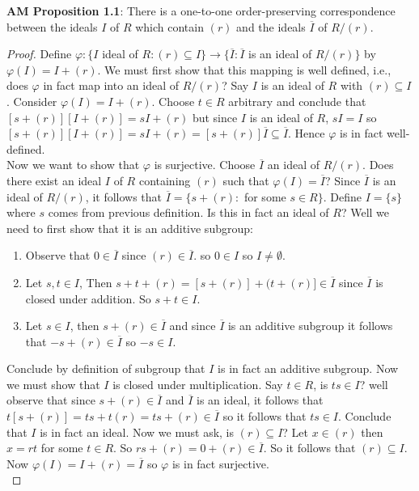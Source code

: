 \documentclass[8pt]{amsart}
\theoremstyle{plain}%
\theoremstyle{definition}
\theoremstyle{remark}
\numberwithin{equation}{section}
\begin{document}
\textbf{AM Proposition 1.1}: There is a one-to-one order-preserving correspondence between the ideals $I$ of $R$ which contain $(r)$ and the ideals $\overline I$ of $R/(r)$.
	\begin{proof}
		Define $\varphi : \{ I$ ideal of $R : (r) \subseteq I\} \to \{\overline I : \overline I$ is an ideal of $R/(r)\}$ by $\varphi(I) = I + (r)$. We must first show that this mapping is well defined, i.e., does $\varphi$ in fact map into an ideal of $R/(r)$? Say $I$ is an ideal of $R$ with $(r) \subseteq I$. Consider $\varphi(I) = I + (r)$. Choose $t \in R$ arbitrary and conclude that $[s + (r)][I + (r)] = sI + (r)$ but since $I$ is an ideal of $R$, $sI = I$ so $[s + (r)][I + (r)] = sI + (r) = [s + (r)] \overline I \subseteq \overline I$. Hence $\varphi$ is in fact well-defined.\\

		Now we want to show that $\varphi$ is surjective. Choose $\overline I$ an ideal of $R/(r)$. Does there exist an ideal $I$ of $R$ containing $(r)$ such that $\varphi(I) = \overline I$? Since $\overline I$ is an ideal of $R/(r)$, it follows that $\overline I = \{s + (r) : $ for some $s \in R\}$. Define $I = \{s\}$ where $s$ comes from previous definition. Is this in fact an ideal of $R$? Well we need to first show that it is an additive subgroup:
		\begin{enumerate}
			\item Observe that $0 \in \overline I$ since $(r) \in \overline I$. so $0 \in I$ so $I \neq \emptyset$.
			\item Let $s, t \in I$, Then $s + t + (r) = [s + (r)] + (t + (r)] \in \overline I$ since $\overline I$ is closed under addition. So $s + t \in I$.
			\item Let $s \in I$, then $s + (r) \in \overline I$ and since $\overline I$ is an additive subgroup it follows that $-s + (r) \in \overline I$ so $-s \in I$.
		\end{enumerate}
		Conclude by definition of subgroup that $I$ is in fact an additive subgroup. Now we must show that $I$ is closed under multiplication. Say $t \in R$, is $ts \in I$? well observe that since $s + (r) \in \overline I$ and $\overline I$ is an ideal, it follows that $t[s+ (r)] = ts + t(r) = ts + (r) \in \overline I$ so it follows that $ts \in I$. Conclude that $I$ is in fact an ideal. Now we must ask, is $(r) \subseteq I$? Let $x \in (r)$ then $x = rt$ for some $t \in R$. So $rs + (r) = 0 + (r) \in \overline I$. So it follows that $(r) \subseteq I$. Now $\varphi(I) = I + (r) = \overline I$ so $\varphi$ is in fact surjective.\\


\end{proof}
\end{document}
